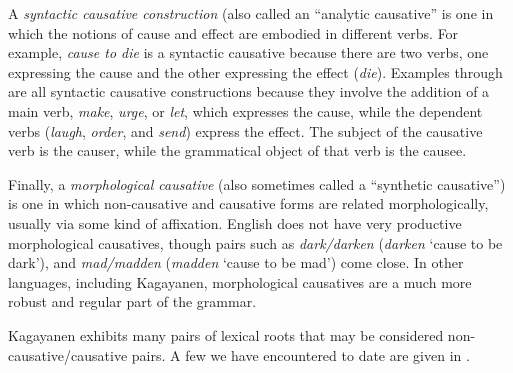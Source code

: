 A \textit{syntactic causative construction} (also called an “analytic causative” is one in which the notions of cause and effect are embodied in different verbs. For example, \textit{cause to die} is a syntactic causative because there are two verbs, one expressing the cause and the other expressing the effect (\textit{die}). Examples  through  are all syntactic causative constructions because they involve the addition of a main verb, \textit{make}, \textit{urge}, or \textit{let}, which expresses the cause, while the dependent verbs (\textit{laugh}, \textit{order}, and \textit{send}) express the effect. The subject of the causative verb is the causer, while the grammatical object of that verb is the causee.

\hspace*{-4.1pt}Finally, a \textit{morphological causative} (also sometimes called a “synthetic causative”) is one in which non-causative and causative forms are related morphologically, usually via some kind of affixation. English does not have very productive morphological causatives, though pairs such as \textit{dark/darken} (\textit{darken} ‘cause to be dark’), and \textit{mad/madden} (\textit{madden} ‘cause to be mad’) come close. In other languages, including Kagayanen, morphological causatives are a much more robust and regular part of the grammar.

Kagayanen exhibits many pairs of lexical roots that may be considered non-causative/causative pairs. A few we have encountered to date are given in .

